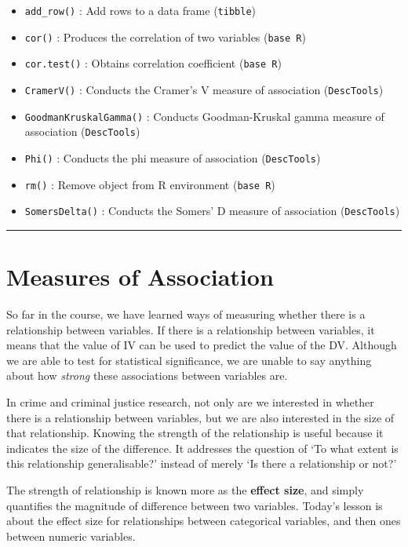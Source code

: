 \documentclass[
]{book}
\providecommand{\tightlist}{%
  \setlength{\itemsep}{0pt}\setlength{\parskip}{0pt}}
\begin{document}
\begin{itemize}
\tightlist
\item
  \texttt{add\_row()} : Add rows to a data frame (\texttt{tibble})
\item
  \texttt{cor()} : Produces the correlation of two variables (\texttt{base\ R})
\item
  \texttt{cor.test()} : Obtains correlation coefficient (\texttt{base\ R})
\item
  \texttt{CramerV()} : Conducts the Cramer's V measure of association (\texttt{DescTools})
\item
  \texttt{GoodmanKruskalGamma()} : Conducts Goodman-Kruskal gamma measure of association (\texttt{DescTools})
\item
  \texttt{Phi()} : Conducts the phi measure of association (\texttt{DescTools})
\item
  \texttt{rm()} : Remove object from R environment (\texttt{base\ R})
\item
  \texttt{SomersDelta()} : Conducts the Somers' D measure of association (\texttt{DescTools})
\end{itemize}

\begin{center}\rule{0.5\linewidth}{0.5pt}\end{center}

\hypertarget{measures-of-association}{%
\section{Measures of Association}\label{measures-of-association}}

So far in the course, we have learned ways of measuring whether there is a relationship between variables. If there is a relationship between variables, it means that the value of IV can be used to predict the value of the DV. Although we are able to test for statistical significance, we are unable to say anything about how \emph{strong} these associations between variables are.

In crime and criminal justice research, not only are we interested in whether there is a relationship between variables, but we are also interested in the size of that relationship. Knowing the strength of the relationship is useful because it indicates the size of the difference. It addresses the question of `To what extent is this relationship generalisable?' instead of merely `Is there a relationship or not?'

The strength of relationship is known more as the \textbf{effect size}, and simply quantifies the magnitude of difference between two variables. Today's lesson is about the effect size for relationships between categorical variables, and then ones between numeric variables.
\end{document}
